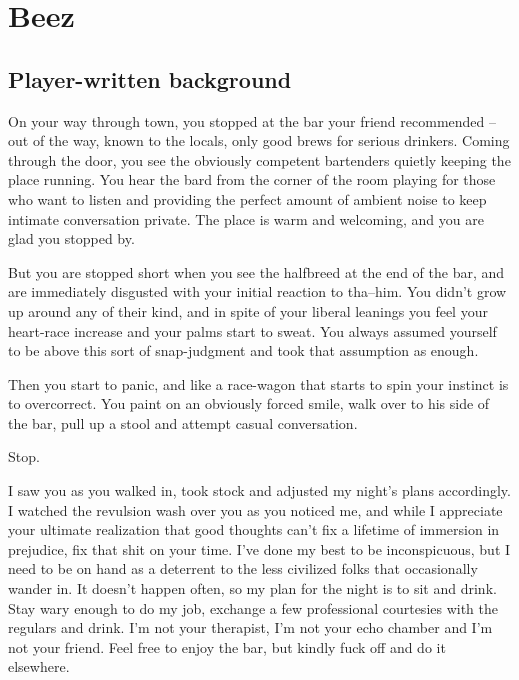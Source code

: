 \section{Beez}\label{sec:beez}
   \medskip
{}

\subsection{Player-written background}

On your way through town, you stopped at the bar your friend recommended -- out of the way, known to the locals, only good brews for serious drinkers.
Coming through the door, you see the obviously competent bartenders quietly keeping the place running.
You hear the bard from the corner of the room playing for those who want to listen and providing the perfect amount of ambient noise to keep intimate conversation private.
The place is warm and welcoming, and you are glad you stopped by.

But you are stopped short when you see the halfbreed at the end of the bar, and are immediately disgusted with your initial reaction to tha--him.
You didn't grow up around any of their kind, and in spite of your liberal leanings you feel your heart-race increase and your palms start to sweat.
You always assumed yourself to be above this sort of snap-judgment and took that assumption as enough.

Then you start to panic, and like a race-wagon that starts to spin your instinct is to overcorrect.
You paint on an obviously forced smile, walk over to his side of the bar, pull up a stool and attempt casual conversation.

Stop.

\hrulefill

I saw you as you walked in, took stock and adjusted my night's plans accordingly.
I watched the revulsion wash over you as you noticed me, and while I appreciate your ultimate realization that good thoughts can't fix a lifetime of immersion in prejudice, fix that shit on your time.
I've done my best to be inconspicuous, but I need to be on hand as a deterrent to the less civilized folks that occasionally wander in.
It doesn't happen often, so my plan for the night is to sit and drink.
Stay wary enough to do my job, exchange a few professional courtesies with the regulars and drink.
I'm not your therapist, I'm not your echo chamber and I'm not your friend.
Feel free to enjoy the bar, but kindly fuck off and do it elsewhere.

